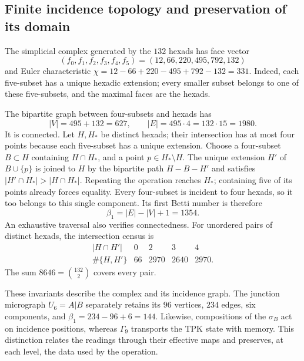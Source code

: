 \subsection{Finite incidence topology and preservation of its domain}
\label{star27:topologia}

The simplicial complex generated by the \(132\) hexads
has face vector
\[
(f_0,f_1,f_2,f_3,f_4,f_5)=(12,66,220,495,792,132)
\]
and Euler characteristic
\(\chi=12-66+220-495+792-132=331\).
Indeed, each five-subset has a unique hexadic extension;
every smaller subset belongs to one of these five-subsets,
and the maximal faces are the hexads.

The bipartite graph between four-subsets and hexads has
\[
|V|=495+132=627,\qquad |E|=495\cdot4=132\cdot15=1980.
\]
It is connected. Let \(H,H_*\) be distinct hexads; their
intersection has at most four points because each five-subset
has a unique extension. Choose a four-subset \(B\subset H\)
containing \(H\cap H_*\), and a point \(p\in H_*\setminus H\).
The unique extension \(H'\) of \(B\cup\{p\}\) is joined to
\(H\) by the bipartite path \(H-B-H'\) and satisfies
\(|H'\cap H_*|>|H\cap H_*|\). Repeating the operation
reaches \(H_*\); containing five of its points already
forces equality. Every four-subset is incident to four
hexads, so it too belongs to this single component.
Its first Betti number is therefore
\[
\beta_1=|E|-|V|+1=1354.
\]
An exhaustive traversal also verifies connectedness.
For unordered pairs of distinct hexads, the intersection
census is
\[
\begin{array}{c|rrrr}
|H\cap H'|&0&2&3&4\\ \hline
\#\{H,H'\}&66&2970&2640&2970 .
\end{array}
\]
The sum \(8646=\binom{132}{2}\) covers every pair.

These invariants describe the complex and its incidence graph.
The junction micrograph \(U_6=A|B\) separately retains its
\(96\) vertices, \(234\) edges, six components, and
\(\beta_1=234-96+6=144\). Likewise, compositions of the
\(\sigma_B\) act on incidence positions, whereas
\(\Gamma_9\) transports the TPK state with memory.
This distinction relates the readings through their
effective maps and preserves, at each level, the data
used by the operation.

